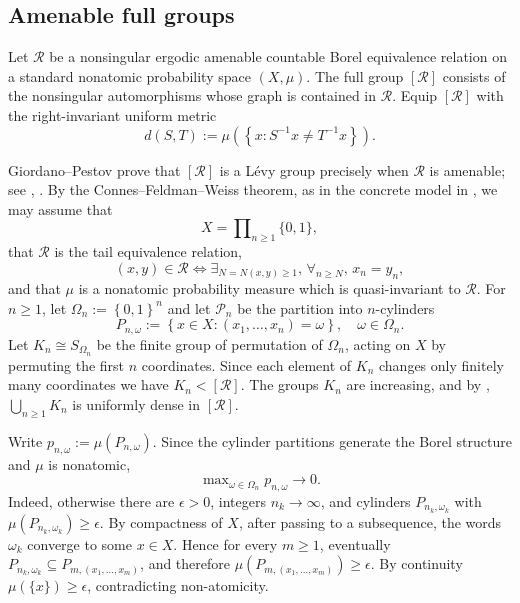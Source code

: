 \documentclass{amsart}
\numberwithin{equation}{subsection}
\theoremstyle{plain}
\theoremstyle{definition}
\theoremstyle{plain}
\begin{document}
\subsection{Amenable full groups}\label{sct:fullamen}

Let \(\mathcal{R}\) be a nonsingular ergodic amenable countable Borel equivalence relation on a standard nonatomic probability space \(\left(X,\mu\right)\). The full group \(\left[\mathcal{R}\right]\) consists of the nonsingular automorphisms whose graph is contained in \(\mathcal{R}\). Equip \(\left[\mathcal{R}\right]\) with the right-invariant uniform metric
\[d\left(S,T\right):=\mu\left(\left\{x:S^{-1}x\neq T^{-1}x\right\}\right).\]

Giordano--Pestov prove that \(\left[\mathcal{R}\right]\) is a L\'{e}vy group precisely when \(\mathcal{R}\) is amenable; see \cite[Thm.~5.7]{giordano2007some}, \cite[\S4.6]{Pestov2006}. By the Connes--Feldman--Weiss theorem, as in the concrete model in \cite[\S5.2]{giordano2007some}, we may assume that
\[X=\prod\nolimits_{n\geq 1}\{0,1\},\]
that \(\mathcal{R}\) is the tail equivalence relation,
\[\left(x,y\right)\in\mathcal{R}\iff\exists_{N=N\left(x,y\right)\geq 1},\,\forall_{n\geq N},\,x_{n}=y_{n},\]
and that \(\mu\) is a nonatomic probability measure which is quasi-invariant to \(\mathcal{R}\). For \(n\geq1\), let \(\Omega_{n}:=\left\{0,1\right\}^{n}\) and let \(\mathcal{P}_{n}\) be the partition into \(n\)-cylinders
\[P_{n,\omega}:=\left\{x\in X:\left(x_{1},\dotsc,x_{n}\right)=\omega\right\},\quad\omega\in\Omega_{n}.\]
Let \(K_{n}\cong S_{\Omega_{n}}\) be the finite group of permutation of \(\Omega_{n}\), acting on \(X\) by permuting the first \(n\) coordinates. Since each element of \(K_{n}\) changes only finitely many coordinates we have \(K_{n}<\left[\mathcal{R}\right]\). The groups \(K_{n}\) are increasing, and by \cite[Lem.~5.2]{giordano2007some}, \(\bigcup_{n\geq1}K_{n}\) is uniformly dense in \(\left[\mathcal{R}\right]\).

\smallskip

Write \(p_{n,\omega}:=\mu\left(P_{n,\omega}\right)\). Since the cylinder partitions generate the Borel structure and \(\mu\) is nonatomic,
\[\max\nolimits_{\omega\in\Omega_{n}}p_{n,\omega}\to0.\]
Indeed, otherwise there are \(\epsilon>0\), integers \(n_{k}\to\infty\), and cylinders \(P_{n_{k},\omega_{k}}\) with \(\mu\left(P_{n_{k},\omega_{k}}\right)\geq\epsilon\). By compactness of \(X\), after passing to a subsequence, the words \(\omega_{k}\) converge to some \(x\in X\). Hence for every \(m\geq1\), eventually \(P_{n_{k},\omega_{k}}\subseteq P_{m,\left(x_{1},\dotsc,x_{m}\right)}\), and therefore \(\mu\left(P_{m,\left(x_{1},\dotsc,x_{m}\right)}\right)\geq\epsilon\). By continuity \(\mu\left(\{x\}\right)\geq\epsilon\), contradicting non-atomicity.
\end{document}
